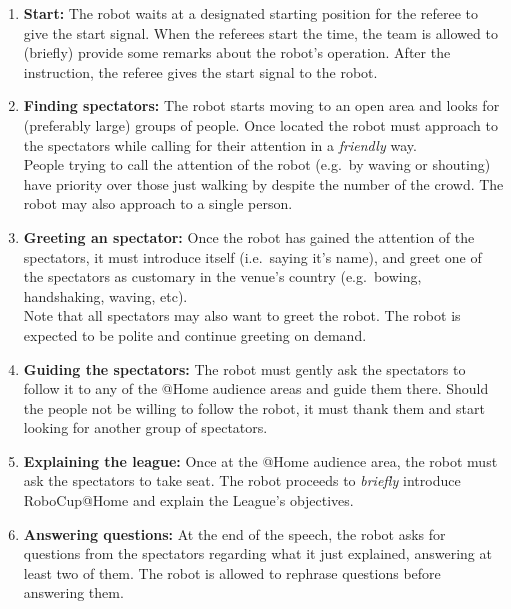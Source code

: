 \begin{enumerate}
	\item \textbf{Start:} The robot waits at a designated starting position for the referee to give the start signal. When the referees start the time, the team is allowed to (briefly) provide some remarks about the robot's operation. After the instruction, the referee gives the start signal to the robot.\\

	\item \textbf{Finding spectators:} The robot starts moving to an open area and looks for (preferably large) groups of people. Once located the robot must approach to the spectators while calling for their attention in a \emph{friendly} way.\\

	People trying to call the attention of the robot (e.g.~by waving or shouting) have priority over those just walking by despite the number of the crowd. The robot may also approach to a single person.\\

	\item \textbf{Greeting an spectator:} Once the robot has gained the attention of the spectators, it must introduce itself (i.e.~saying it's name), and greet one of the spectators as customary in the venue's country (e.g.~bowing, handshaking, waving, etc).\\

	Note that all spectators may also want to greet the robot. The robot is expected to be polite and continue greeting on demand.\\

	\item \textbf{Guiding the spectators:} The robot must gently ask the spectators to follow it to any of the @Home audience areas and guide them there. Should the people not be willing to follow the robot, it must thank them and start looking for another group of spectators.\\

	\item \textbf{Explaining the league:} Once at the @Home audience area, the robot must ask the spectators to take seat. The robot proceeds to \textit{briefly} introduce RoboCup@Home and explain the League's objectives. \\

	\item \textbf{Answering questions:} At the end of the speech, the robot asks for questions from the spectators regarding what it just explained, answering at least two of them. The robot is allowed to rephrase questions before answering them.\\

\end{enumerate}

